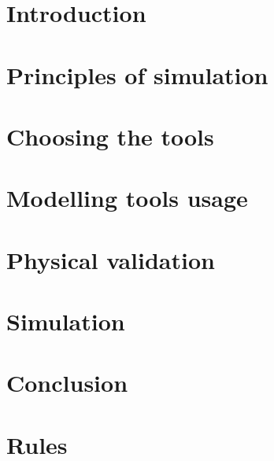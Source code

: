 \documentclass[12pt,a4paper]{report}
\begin{document}


\tableofcontents

\listoffigures

\listoftables

\clearpage
\setcounter{page}{1}
\chapter{Introduction}


\chapter{Principles of simulation}


\chapter{Choosing the tools}


\chapter{Modelling tools usage}


\chapter{Physical validation}


\chapter{Simulation}


\chapter{Conclusion}





\appendix
\chapter{Rules}

\end{document}
